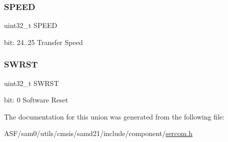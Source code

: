 \subsubsection{\texorpdfstring{SPEED}{SPEED}}
{\footnotesize\ttfamily uint32\+\_\+t S\+P\+E\+ED}

bit\+: 24..25 Transfer Speed \mbox{\label{union_s_e_r_c_o_m___i2_c_s___c_t_r_l_a___type_a34cd956a8da179cbd5fc9060306d420e}} 
\subsubsection{\texorpdfstring{SWRST}{SWRST}}
{\footnotesize\ttfamily uint32\+\_\+t S\+W\+R\+ST}

bit\+: 0 Software Reset 

The documentation for this union was generated from the following file\+:\begin{DoxyCompactItemize}
\item 
A\+S\+F/sam0/utils/cmsis/samd21/include/component/\mbox{\hyperlink{utils_2cmsis_2samd21_2include_2component_2sercom_8h}{sercom.\+h}}\end{DoxyCompactItemize}
